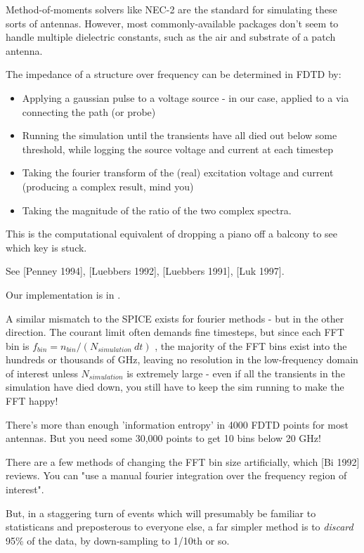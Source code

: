 \documentclass[paper.tex]{subfiles}
\begin{document}
\clearpage
{}

Method-of-moments solvers like NEC-2 are the standard for simulating these sorts of antennas. However, most commonly-available packages don't seem to handle multiple dielectric constants, such as the air and substrate of a patch antenna.

The impedance of a structure over frequency can be determined in FDTD by:

\begin{itemize}
  \item Applying a gaussian pulse to a voltage source - in our case, applied to a via connecting the path (or probe)
  \item Running the simulation until the transients have all died out below some threshold, while logging the source voltage and current at each timestep
  \item Taking the fourier transform of the (real) excitation voltage and current (producing a complex result, mind you)
  \item Taking the magnitude of the ratio of the two complex spectra.
\end{itemize}

This is the computational equivalent of dropping a piano off a balcony to see which key is stuck.

See [Penney 1994], [Luebbers 1992], [Luebbers 1991], [Luk 1997]. 

Our implementation is in .

A similar mismatch to the SPICE exists for fourier methods - but in the other direction.  The courant limit often demands fine timesteps, but since each FFT bin is $ f_{bin} = n_{bin} / (N_{simulation} \ dt) $ , the majority of the FFT bins exist into the hundreds or thousands of GHz, leaving no resolution in the low-frequency domain of interest unless $N_{simulation}$ is extremely large - even if all the transients in the simulation have died down, you still have to keep the sim running to make the FFT happy! 

There's more than enough 'information entropy' in 4000 FDTD points for most antennas. But you need some 30,000 points to get 10 bins below 20 GHz!

There are a few methods of changing the FFT bin size artificially, which [Bi 1992] reviews. You can "use a manual fourier integration over the frequency region of interest".

But, in a staggering turn of events which will presumably be familiar to statisticans and preposterous to everyone else, a far simpler method is to {\it discard} 95\% of the data, by down-sampling to 1/10th or so.
\end{document}

